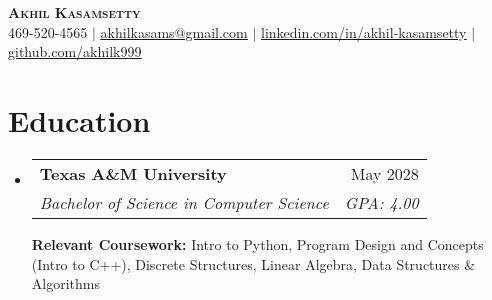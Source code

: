 \documentclass[letterpaper,11pt]{article}
\makeatletter
\newcommand{\resumeEducation}[6]{
  \vspace{-2pt}\item
    \begin{tabular*}{0.97\textwidth}[t]{l@{\extracolsep{\fill}}r}
      \textbf{#1} & #2 \\
      \textit{\small#3} & \textit{\small #4} \\
    \end{tabular*}
        \textbf{\small#5:} {\small#6} \\
}
\newcommand{\resumeSubHeadingListStart}{\begin{itemize}[leftmargin=0.15in, label={}]}
\newcommand{\resumeSubHeadingListEnd}{\end{itemize}}
\makeatother
\begin{document}

\begin{center}
    \textbf{\Huge \scshape Akhil Kasamsetty} \\ \vspace{1pt}
    \small 469-520-4565 $|$ \href{mailto:akhilkasams@gmail.com}{\underline{akhilkasams@gmail.com}} $|$ 
    \href{https://linkedin.com/in/akhil-kasamsetty}{\underline{linkedin.com/in/akhil-kasamsetty}} $|$
    \href{https://github.com/akhilk999}{\underline{github.com/akhilk999}}
\end{center}



\section{Education}
  \resumeSubHeadingListStart
    \resumeEducation
      {Texas A\&M University}{May 2028}
      {Bachelor of Science in Computer Science}{GPA: 4.00}
      {Relevant Coursework}{Intro to Python, Program Design and Concepts (Intro to C++), Discrete Structures, Linear Algebra, Data Structures \& Algorithms}
  \resumeSubHeadingListEnd


\end{document}
